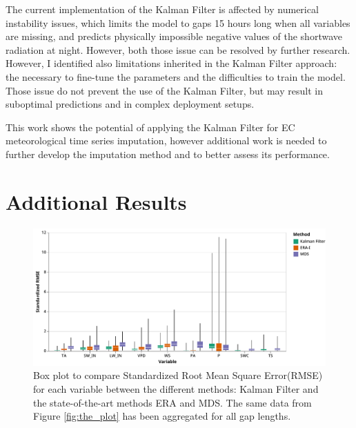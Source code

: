 \documentclass{article}
\newcommand{\imgwidth}{6in}
\let\Oldsection\section
\renewcommand{\section}{\FloatBarrier\Oldsection}
\let\Oldsubsection\subsection
\renewcommand{\subsection}{\FloatBarrier\Oldsubsection}
\begin{document}
The current implementation of the Kalman Filter is affected by numerical instability issues, which limits the model to gaps 15 hours long when all variables are missing, and predicts physically impossible negative values of the shortwave radiation at night. However, both those issue can be resolved by further research. However, I identified also limitations inherited in the Kalman Filter approach: the necessary to fine-tune the parameters and the difficulties to train the model. Those issue do not prevent the use of the Kalman Filter, but may result in suboptimal predictions and in complex deployment setups.

This work shows the potential of applying the Kalman Filter for EC meteorological time series imputation, however additional work is needed to further develop the imputation method and to better assess its performance. 

\printbibliography

\pagebreak

\appendix

\renewcommand\thefigure{\thesection.\arabic{figure}} 
\renewcommand\thetable{\thesection.\arabic{table}} 
\renewcommand\theequation{\thesection.\arabic{equation}} 

\FloatBarrier

\section{Additional Results}

\setcounter{figure}{0} 
\setcounter{table}{0} 


\begin{figure}[H]
    \centerline{\includegraphics[width=\imgwidth]{the_plot_stand}}
\caption{Box plot to compare Standardized Root Mean Square Error(RMSE) for each variable between the different methods: Kalman Filter and the state-of-the-art methods ERA and MDS. The same data from Figure \ref{fig:the_plot} has been aggregated for all gap lengths.}
\label{fig:the_plot_stand}
\end{figure}
\end{document}
